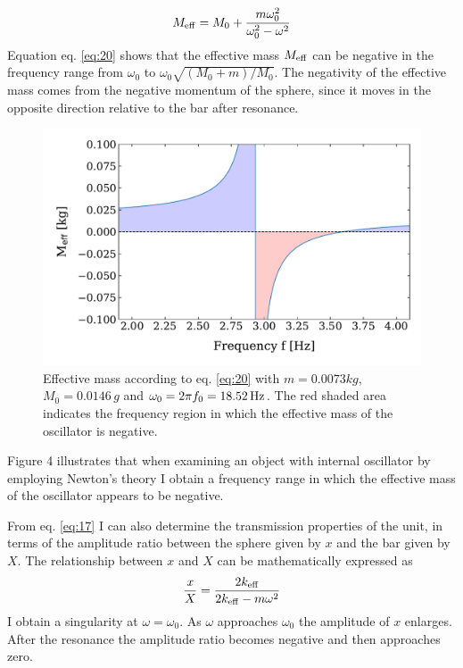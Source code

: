 \documentclass[12pt]{article}
\begin{document}
\begin{equation}\label{eq:20}
 M_{\rm eff} =	M_0 + \frac{m \omega_0^2}{\omega_0^2 -\omega ^2}
\end{equation} 
Equation eq. \ref{eq:20} shows that the effective mass $M_{\rm eff}$ can be negative in the frequency range from $\omega_0$ to $\omega_0 \sqrt{(M_0 + m)/ M_0}.$ The negativity of the effective mass comes from the negative momentum of the sphere, since it moves in the opposite direction relative to the bar after resonance. 
\begin{figure}[hbt]
  \includegraphics[width=0.7\columnwidth]{fundamentals/effective_mass.pdf}
  \caption{Effective mass according to eq. \ref{eq:20} with $m=0.0073 kg$, $M_{0}=0.0146\, g$ and $\omega_0=2\pi f_{0}=18.52\,{\rm Hz}$. The red shaded area indicates the frequency region in which the effective mass of the oscillator is negative.}
\end{figure}
Figure 4 illustrates that when examining an object with internal oscillator by employing Newton's theory I obtain a frequency range in which the effective mass of the oscillator appears to be negative.

    From eq. \ref{eq:17} I can also determine the transmission properties of the unit, in terms of the amplitude ratio between the sphere given by $x$ and the bar given by $X$. The relationship between $x$ and $X$ can be mathematically expressed as
    \begin{equation} \label{eq:ratio}
        \frac{x}{X} = \frac{2k_{\rm eff}}{2k_{\rm eff} - m\omega^2}
    \end{equation}
I obtain a singularity at $\omega = \omega_0$. As $\omega$ approaches $\omega_0$ the amplitude of $x$ enlarges. After the resonance the amplitude ratio becomes negative and then approaches zero. 
\end{document}
